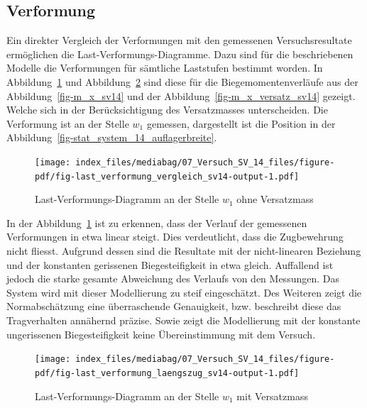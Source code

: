 \documentclass[
  12pt,
  letterpaper,
  egregdoesnotlikesansseriftitles]{scrreprt}
\begin{document}
\hypertarget{verformung-1}{%
\subsection{Verformung}\label{verformung-1}}

Ein direkter Vergleich der Verformungen mit den gemessenen
Versuchsresultate ermöglichen die Last-Verformungs-Diagramme. Dazu sind
für die beschriebenen Modelle die Verformungen für sämtliche Laststufen
bestimmt worden. In Abbildung~\ref{fig-last_verformung_vergleich_sv14}
und Abbildung~\ref{fig-last_verformung_laengszug_sv14} sind diese für
die Biegemomentenverläufe aus der Abbildung~\ref{fig-m_x_sv14} und der
Abbildung~\ref{fig-m_x_versatz_sv14} gezeigt. Welche sich in der
Berücksichtigung des Versatzmasses unterscheiden. Die Verformung ist an
der Stelle \(w_1\) gemessen, dargestellt ist die Position in der
Abbildung~\ref{fig-stat_system_14_auflagerbreite}.

\begin{figure}[H]

{\centering \texttt{[image: index\_files/mediabag/07\_Versuch\_SV\_14\_files/figure-pdf/fig-last\_verformung\_vergleich\_sv14-output-1.pdf]}

}

\caption{\label{fig-last_verformung_vergleich_sv14}Last-Verformungs-Diagramm
an der Stelle \(w_1\) ohne Versatzmass}

\end{figure}

In der Abbildung~\ref{fig-last_verformung_vergleich_sv14} ist zu
erkennen, dass der Verlauf der gemessenen Verformungen in etwa linear
steigt. Dies verdeutlicht, dass die Zugbewehrung nicht fliesst. Aufgrund
dessen sind die Resultate mit der nicht-linearen Beziehung und der
konstanten gerissenen Biegesteifigkeit in etwa gleich. Auffallend ist
jedoch die starke gesamte Abweichung des Verlaufs von den Messungen. Das
System wird mit dieser Modellierung zu steif eingeschätzt. Des Weiteren
zeigt die Normabschätzung eine überraschende Genauigkeit, bzw.
beschreibt diese das Tragverhalten annähernd präzise. Sowie zeigt die
Modellierung mit der konstante ungerissenen Biegesteifigkeit keine
Übereinstimmung mit dem Versuch.

\begin{figure}[H]

{\centering \texttt{[image: index\_files/mediabag/07\_Versuch\_SV\_14\_files/figure-pdf/fig-last\_verformung\_laengszug\_sv14-output-1.pdf]}

}

\caption{\label{fig-last_verformung_laengszug_sv14}Last-Verformungs-Diagramm
an der Stelle \(w_1\) mit Versatzmass}

\end{figure}
\end{document}
